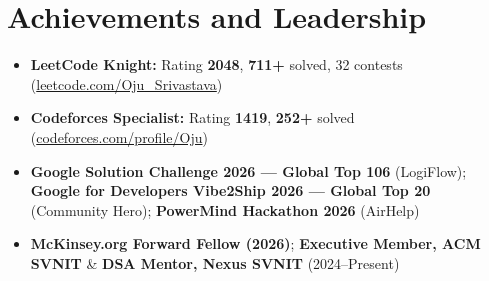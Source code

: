 \documentclass[a4paper,10pt]{article}
\begin{document}
\section{Achievements and Leadership}
\small
\begin{itemize}
  \item \textbf{LeetCode Knight:} Rating \textbf{2048}, \textbf{711+} solved, 32 contests (\href{https://leetcode.com/Oju_Srivastava}{leetcode.com/Oju\_Srivastava})
  \item \textbf{Codeforces Specialist:} Rating \textbf{1419}, \textbf{252+} solved (\href{https://codeforces.com/profile/Oju}{codeforces.com/profile/Oju})
  \item \textbf{Google Solution Challenge 2026 --- Global Top 106} (LogiFlow); \textbf{Google for Developers Vibe2Ship 2026 --- Global Top 20} (Community Hero); \textbf{PowerMind Hackathon 2026} (AirHelp)
  \item \textbf{McKinsey.org Forward Fellow (2026)}; \textbf{Executive Member, ACM SVNIT} \& \textbf{DSA Mentor, Nexus SVNIT} (2024--Present)
\end{itemize}
\end{document}
